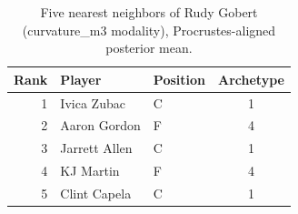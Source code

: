 \begin{table}[htbp]
  \centering\small
  \begin{tabular}{rllc}
    \toprule
    Rank & Player & Position & Archetype \\
    \midrule
    1 & Ivica Zubac & C & 1 \\
    2 & Aaron Gordon & F & 4 \\
    3 & Jarrett Allen & C & 1 \\
    4 & KJ Martin & F & 4 \\
    5 & Clint Capela & C & 1 \\
    \bottomrule
  \end{tabular}
  \caption{Five nearest neighbors of Rudy Gobert (curvature_m3 modality), Procrustes-aligned posterior mean.}
  \label{tab:Rudy_Gobert_neighbors_curvature_m3}
\end{table}

